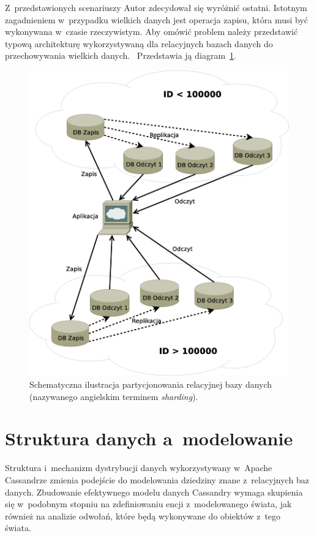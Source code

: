 Z~przedstawionych scenariuszy Autor zdecydował się wyróżnić ostatni. Istotnym zagadnieniem w~przypadku wielkich danych jest operacja zapisu, która musi być wykonywana w~czasie rzeczywistym. Aby omówić problem należy przedstawić typową architekturę wykorzystywaną dla relacyjnych bazach danych do przechowywania wielkich danych.~\cite{sharding_in_mysql} Przedstawia ją diagram~\ref{fig:sharding}.

\begin{figure}[ht!]
	\centering
	\includegraphics[width=.8\textwidth]{figures/sharding.eps}
	\caption{Schematyczna ilustracja partycjonowania relacyjnej bazy danych (nazywanego angielskim terminem \emph{sharding}).}
	\label{fig:sharding}
\end{figure}

\section{Struktura danych a~modelowanie}
\label{sec:relative_vs_cassandra_model}

Struktura i~mechanizm dystrybucji danych wykorzystywany w~Apache Cassandrze zmienia podejście do modelowania dziedziny znane z~relacyjnych baz danych. Zbudowanie efektywnego modelu danych Cassandry wymaga skupienia się w~podobnym stopniu na zdefiniowaniu encji z~modelowanego świata, jak również na analizie odwołań, które będą wykonywane do obiektów z~tego świata.~\cite{modeling_best_practices_pt_1}

